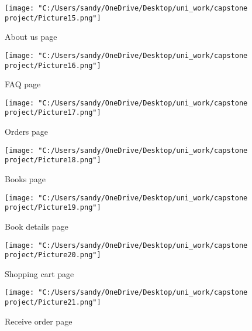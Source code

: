 \documentclass[12pt]{article}
\begin{document}
\begin{figure}[H]
	\centering
	\texttt{[image: "C:/Users/sandy/OneDrive/Desktop/uni\_work/capstone project/Picture15.png"]}
	\caption{About us page}
	
\end{figure}
\begin{figure}[H]
	\centering
	\texttt{[image: "C:/Users/sandy/OneDrive/Desktop/uni\_work/capstone project/Picture16.png"]}
	\caption{FAQ page}
	
\end{figure}
\begin{figure}[H]
	\centering
	\texttt{[image: "C:/Users/sandy/OneDrive/Desktop/uni\_work/capstone project/Picture17.png"]}
	\caption{Orders page}
	
\end{figure}
\begin{figure}[H]
	\centering
	\texttt{[image: "C:/Users/sandy/OneDrive/Desktop/uni\_work/capstone project/Picture18.png"]}
	\caption{Books page}
	
\end{figure}
\begin{figure}[H]
	\centering
	\texttt{[image: "C:/Users/sandy/OneDrive/Desktop/uni\_work/capstone project/Picture19.png"]}
	\caption{Book details page}
	
\end{figure}
\begin{figure}[H]
	\centering
	\texttt{[image: "C:/Users/sandy/OneDrive/Desktop/uni\_work/capstone project/Picture20.png"]}
	\caption{Shopping cart page}
	
\end{figure}
\begin{figure}[H]
	\centering
	\texttt{[image: "C:/Users/sandy/OneDrive/Desktop/uni\_work/capstone project/Picture21.png"]}
	\caption{Receive order page}
	
\end{figure}
\end{document}
